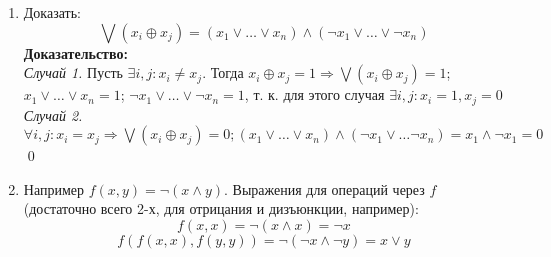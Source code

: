 \documentclass[12pt]{article}
\begin{document}
\begin{enumerate}
        \item Доказать: 
        \[ \bigvee (x_i \oplus x_j) = (x_1 \vee \dots \vee 
        x_n) \wedge (\lnot x_1 \vee \dots \vee \lnot x_n ) \]
        \textbf{Доказательство:} \\
        \textit{Случай 1.} Пусть \( \exists i, j: x_i \neq x_j \). Тогда 
        \( x_i \oplus x_j = 1 \Rightarrow \bigvee (x_i \oplus x_j) = 1 \);
        \( x_1 \vee \dots \vee x_n = 1\); \( \lnot x_1 \vee \dots
        \vee \lnot x_n = 1 \), т. к. для этого случая
        \( \exists i, j: x_i = 1, x_j = 0 \)\\
        \textit{Случай 2.} \( \forall i, j: x_i = x_j \Rightarrow 
        \bigvee (x_i \oplus x_j) = 0; (x_1 \vee \dots
        \vee x_n) \wedge (\lnot x_1 \vee \dots \lnot x_n) = 
        x_1 \wedge \lnot x_1 = 0 \)
        \qed 

        \item Например \( f(x, y) = \lnot (x \wedge y) \).
        Выражения для операций через $f$ (достаточно всего 2-х, для
        отрицания и дизъюнкции, например):
        \[ f(x, x) = \lnot (x \wedge x) = \lnot x \]
        \[ f(f(x, x), f(y, y)) = \lnot (\lnot x \wedge \lnot y) =
        x \vee y \]
    \end{enumerate}
\end{document}
